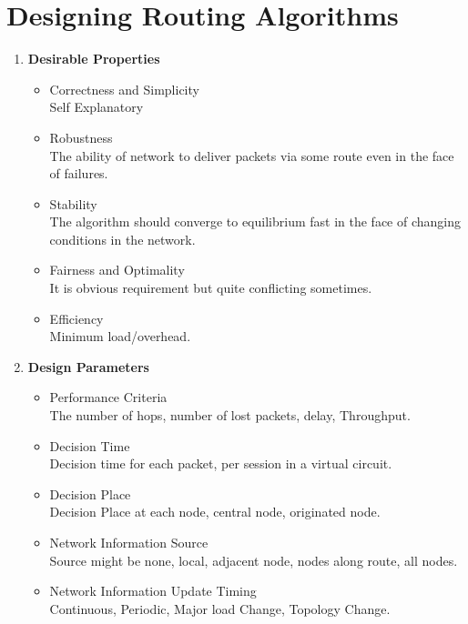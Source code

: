\documentclass[12pt]{article}
\begin{document}
\maketitle

\section{Designing Routing Algorithms}

\begin{enumerate}[label=(\alph*)]
    \item \textbf{Desirable Properties}
    \begin{itemize}
        \item Correctness and Simplicity \\
            Self Explanatory
        \item Robustness \\
            The ability of network to deliver packets via some route even in the face of failures.
        \item Stability \\
            The algorithm should converge to equilibrium fast in the face of changing conditions in the network.
        \item Fairness and Optimality \\
            It is obvious requirement but quite conflicting sometimes.
        \item Efficiency \\
            Minimum load/overhead.
    \end{itemize}
    
    \item \textbf{Design Parameters}
    \begin{itemize}
        \item Performance Criteria \\
            The number of hops, number of lost packets, delay, Throughput.
        \item Decision Time \\
            Decision time for each packet, per session in a virtual circuit.
        \item Decision Place \\
            Decision Place at each node, central node, originated node.
        \item Network Information Source \\
            Source might be none, local, adjacent node, nodes along route, all nodes.
        \item Network Information Update Timing \\
            Continuous, Periodic, Major load Change, Topology Change.
    \end{itemize}
\end{enumerate}
\end{document}
